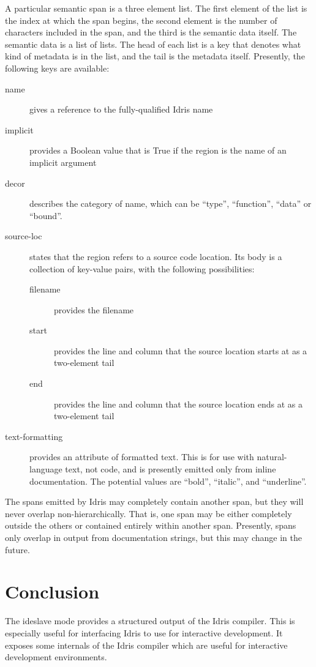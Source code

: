\documentclass{article}
\begin{document}
A particular semantic span is a three element list.
The first element of the list is the index at which the span begins, the second element is the number of characters included in the span, and the third is the semantic data itself.
The semantic data is a list of lists.
The head of each list is a key that denotes what kind of metadata is in the list, and the tail is the metadata itself.
Presently, the following keys are available:
\begin{description}
\item[name] gives a reference to the fully-qualified Idris name
\item[implicit] provides a Boolean value that is True if the region is the name of an implicit argument
\item[decor] describes the category of name, which can be ``type'', ``function'', ``data'' or ``bound''.
\item[source-loc] states that the region refers to a source code location. Its body is a collection of key-value pairs, with the following possibilities:
  \begin{description}
  \item[filename] provides the filename
  \item[start] provides the line and column that the source location starts at as a two-element tail
  \item[end]  provides the line and column that the source location ends at as a two-element tail
  \end{description}
\item[text-formatting] provides an attribute of formatted text. This is for use with natural-language text, not code, and is presently emitted only from inline documentation. The potential values are ``bold'', ``italic'', and ``underline''.

\end{description}

The spans emitted by Idris may completely contain another span, but they will never overlap non-hierarchically. That is, one span may be either completely outside the others or contained entirely within another span.
Presently, spans only overlap in output from documentation strings, but this may change in the future.

\section{Conclusion}
The ideslave mode provides a structured output of the Idris compiler.
This is especially useful for interfacing Idris to use for interactive development.
It exposes some internals of the Idris compiler which are useful for interactive development environments.
\end{document}
